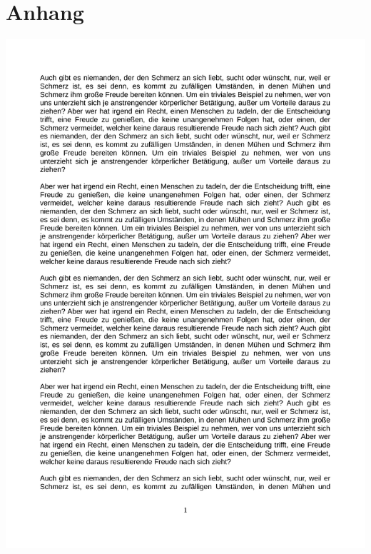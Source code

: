 \appendix
\section{Anhang} \label{app:bsp-text}

\begin{center} %
	\includegraphics[trim = 0mm 0mm 0mm 0mm,clip, page = 1, width=1\textwidth]{Daten/Beispiel_Text.pdf}\\
\end{center}

